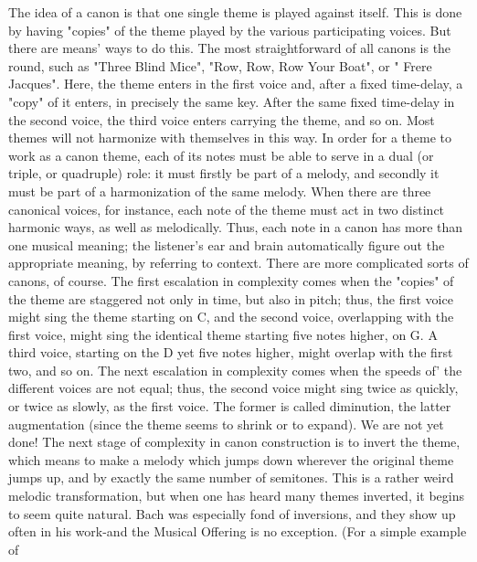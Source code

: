 The idea of a canon is that one single theme is played against itself. This is done by having "copies" of the theme played by the various participating voices. But there are means' ways to do this. The most straightforward of all canons is the round, such as "Three Blind Mice", "Row, Row, Row Your Boat", or " Frere Jacques". Here, the theme enters in the first voice and, after a fixed time-delay, a "copy" of it enters, in precisely the same key. After the same fixed time-delay in the second voice, the third voice enters carrying the theme, and so on. Most themes will not harmonize with themselves in this way. In order for a theme to work as a canon theme, each of its notes must be able to serve in a dual (or triple, or quadruple) role: it must firstly be part of a melody, and secondly it must be part of a harmonization of the same melody. When there are three canonical voices, for instance, each note of the theme must act in two distinct harmonic ways, as well as melodically. Thus, each note in a canon has more than one musical meaning; the listener's ear and brain automatically figure out the appropriate meaning, by referring to context. There are more complicated sorts of canons, of course. The first escalation in complexity comes when the "copies" of the theme are staggered not only in time, but also in pitch; thus, the first voice might sing the theme starting on C, and the second voice, overlapping with the first voice, might sing the identical theme starting five notes higher, on G. A third voice, starting on the D yet five notes higher, might overlap with the first two, and so on. The next escalation in complexity comes when the speeds of' the different voices are not equal; thus, the second voice might sing twice as quickly, or twice as slowly, as the first voice. The former is called diminution, the latter augmentation (since the theme seems to shrink or to expand). We are not yet done! The next stage of complexity in canon construction is to invert the theme, which means to make a melody which jumps down wherever the original theme jumps up, and by exactly the same number of semitones. This is a rather weird melodic transformation, but when one has heard many themes inverted, it begins to seem quite natural. Bach was especially fond of inversions, and they show up often in his work-and the Musical Offering is no exception. (For a simple example of 







